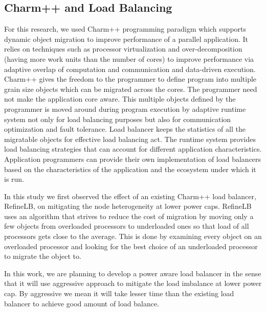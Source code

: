 \subsection {Charm++ and Load Balancing} 
For this research, we used Charm++ programming paradigm which supports
dynamic object migration to improve performance of a parallel
application\cite{KaleCharm}.  It relies on techniques such as processor
virtualization and over-decomposition (having more work units than the
    number of cores) to improve performance via adaptive overlap of
computation and communication and data-driven execution.  Charm++ gives the
freedom to the programmer to define program into multiple grain size objects
which can be migrated across the cores. The programmer need not make the
application core aware. This multiple objects defined by the programmer is
moved around during program execution by adaptive runtime system not only
for load balancing purposes but also for communication optimization and
fault tolerance. Load balancer keeps the statistics of all the migratable
objects for effective load balancing act\cite{appBalancer99}.  The runtime
system provides load balancing strategies that can account for different
application characteristics.  Application programmers can provide their own
implementation of load balancers based on the characteristics of the
application and the ecosystem under which it is run.
     
     In this study we first observed the effect of an existing Charm++ load
     balancer, RefineLB, on mitigating the node heterogeneity at lower power
     caps.  RefineLB uses an algorithm that strives to reduce the cost of
     migration by moving only a few objects from overloaded processors to
     underloaded ones so that load of all processors gets close to the
     average.  This is done by examining every object on an overloaded
     processor and looking for the best choice of an underloaded processor
     to migrate the object to\cite{Zheng}.   
     
     In this work, we are planning to develop a power aware  load balancer
     in the sense that it will use aggressive approach to mitigate the load
     imbalance at lower power cap. By aggressive we mean it will take lesser
     time than the existing load balancer to achieve good amount of load
     balance.




